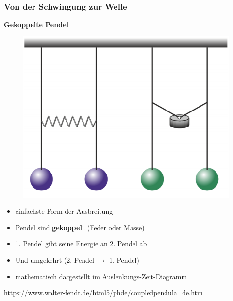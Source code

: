 \documentclass{beamer}
\begin{document}
\frame
{
  \frametitle{Von der Schwingung zur Welle}
  \textbf{Gekoppelte Pendel}
	\begin{figure}
	\includegraphics[scale=0.2]{Pendel_gekoppelt}
	\end{figure}
	\begin{itemize}
	\item einfachste Form der Ausbreitung
	\item Pendel sind \textbf{gekoppelt} (Feder oder Masse)
	\item 1. Pendel gibt seine Energie an 2. Pendel ab
	\item Und umgekehrt (2. Pendel $\rightarrow$ 1. Pendel)
	\item mathematisch dargestellt im Auslenkungs-Zeit-Diagramm
	\end{itemize}
	\url{https://www.walter-fendt.de/html5/phde/coupledpendula_de.htm}
}
\end{document}
